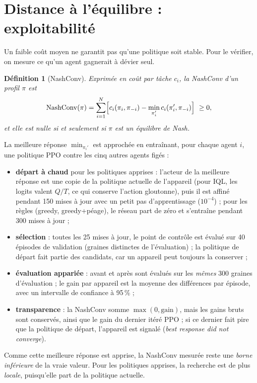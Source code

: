 \documentclass[11pt,a4paper]{article}
\newtheorem{definition}{Définition}
\begin{document}
\section{Distance à l'équilibre : exploitabilité}

Un faible coût moyen ne garantit pas qu'une politique soit stable. Pour le vérifier, on mesure ce qu'un agent
gagnerait à dévier seul.

\begin{definition}[NashConv]
Exprimée en coût par tâche $c_i$, la NashConv d'un profil $\pi$ est
\begin{equation}
  \mathrm{NashConv}(\pi) = \sum_{i=1}^{N}\Bigl[c_i(\pi_i,\pi_{-i}) - \min_{\pi_i'} c_i(\pi_i',\pi_{-i})\Bigr]\ \ge 0 ,
\end{equation}
et elle est nulle si et seulement si $\pi$ est un équilibre de Nash.
\end{definition}

La meilleure réponse $\min_{\pi_i'}$ est approchée en entraînant, pour chaque agent $i$, une politique PPO
contre les cinq autres agents figés :
\begin{itemize}
  \item \textbf{départ à chaud} pour les politiques apprises : l'acteur de la meilleure réponse est une copie de la
        politique actuelle de l'appareil (pour IQL, les logits valent $Q/T$, ce qui conserve l'action gloutonne), puis
        il est affiné pendant 150 mises à jour avec un petit pas d'apprentissage ($10^{-4}$) ; pour les règles
        (greedy, greedy+péage), le réseau part de zéro et s'entraîne pendant 300 mises à jour ;
  \item \textbf{sélection} : toutes les 25 mises à jour, le point de contrôle est évalué sur 40 épisodes de
        validation (graines distinctes de l'évaluation) ; la politique de départ fait partie des candidats, car un
        appareil peut toujours la conserver ;
  \item \textbf{évaluation appariée} : avant et après sont évalués sur les \emph{mêmes} 300 graines d'évaluation ;
        le gain par appareil est la moyenne des différences par épisode, avec un intervalle de confiance à 95\,\% ;
  \item \textbf{transparence} : la NashConv somme $\max(0,\text{gain})$, mais les gains bruts sont conservés, ainsi
        que le gain du dernier itéré PPO ; si ce dernier fait pire que la politique de départ, l'appareil est signalé
        (\emph{best response did not converge}).
\end{itemize}
Comme cette meilleure réponse est apprise, la NashConv mesurée reste une \emph{borne inférieure} de la vraie
valeur. Pour les politiques apprises, la recherche est de plus \emph{locale}, puisqu'elle part de la politique
actuelle.
\end{document}
